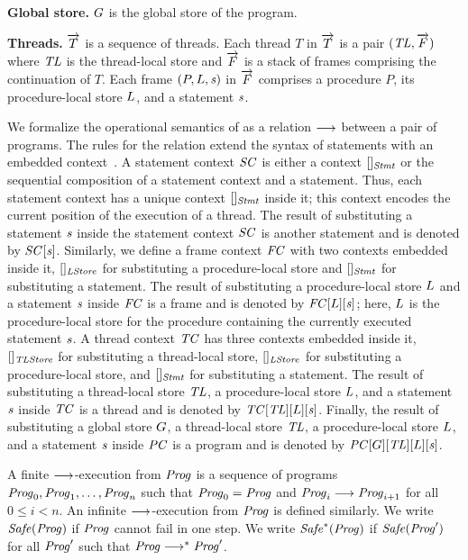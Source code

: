 \noindent
{\bf Global store.}
$G$ is the global store of the program.

\noindent
{\bf Threads.}
$\overrightarrow{T}$ is a sequence of threads.
Each thread $T$ in $\overrightarrow{T}$ is a pair $(\mathit{TL}, \overrightarrow{F})$ where
$\mathit{TL}$ is the thread-local store and $\overrightarrow{F}$ is a stack of frames comprising the continuation of $T$.  
Each frame $(P, L, \mathit{s})$ in $\overrightarrow{F}$ comprises a procedure $P$, its procedure-local store $L$, 
and a statement $\mathit{s}$.

We formalize the operational semantics of \civl as a relation $\longrightarrow$ between a pair of programs.
The rules for the relation extend the syntax of statements with an embedded context~\cite{WrightF94}.
A statement context $\mathit{SC}$ is either a context $[]_{\mathit{Stmt}}$ or the sequential composition of a 
statement context and a statement.
Thus, each statement context has a unique context $[]_{\mathit{Stmt}}$ inside it;
this context encodes the current position of the execution of a thread.
The result of substituting a statement $\mathit{s}$ inside the statement context $\mathit{SC}$ 
is another statement and is denoted by $\mathit{SC}[\mathit{s}]$.
Similarly, we define a frame context $\mathit{FC}$ with two contexts embedded inside it, 
$[]_{\mathit{LStore}}$ for substituting a procedure-local store
and $[]_{\mathit{Stmt}}$ for substituting a statement.
The result of substituting a procedure-local store $L$ and a statement $\mathit{s}$ inside 
$\mathit{FC}$ is a frame and is denoted by $\mathit{FC}[L][\mathit{s}]$;
here, $L$ is the procedure-local store for the procedure containing the currently executed statement $\mathit{s}$.
A thread context $\mathit{TC}$ has three contexts embedded inside it, $[]_{\mathit{TLStore}}$ for substituting a thread-local store, 
$[]_{\mathit{LStore}}$ for substituting a procedure-local store, and $[]_{\mathit{Stmt}}$ for substituting a statement.
The result of substituting a thread-local store $\mathit{TL}$, a procedure-local store $L$, and a statement $\mathit{s}$ inside $\mathit{TC}$ 
is a thread and is denoted by $\mathit{TC}[\mathit{TL}][L][\mathit{s}]$.
Finally, the result of substituting a global store $G$, a thread-local store $\mathit{TL}$, 
a procedure-local store $L$, and a statement $\mathit{s}$ inside $\mathit{PC}$ is a program and is denoted by $\mathit{PC}[G][\mathit{TL}][L][\mathit{s}]$.

A finite $\longrightarrow$-execution from $\mathit{Prog}$ is a sequence of programs $\mathit{Prog}_0,\mathit{Prog}_1,\ldots,\mathit{Prog}_n$ such that $\mathit{Prog}_0 = \mathit{Prog}$ 
and $\mathit{Prog}_i \longrightarrow \mathit{Prog}_{i+1}$ for all $0 \leq i < n$.
An infinite $\longrightarrow$-execution from $\mathit{Prog}$ is defined similarly.
We write $\mathit{Safe}(\mathit{Prog})$ if $\mathit{Prog}$ cannot fail in one step.
We write $\mathit{Safe}^*(\mathit{Prog})$ if $\mathit{Safe}(\mathit{Prog}')$ for all $\mathit{Prog}'$ such that $\mathit{Prog} \longrightarrow^* \mathit{Prog}'$.


